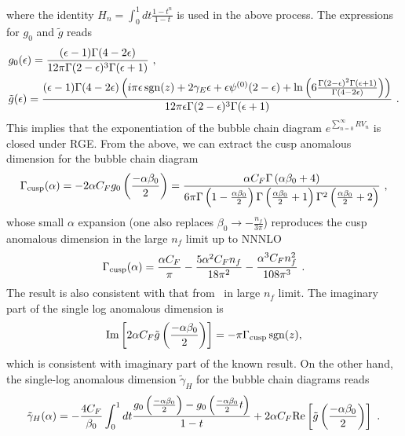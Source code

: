 \documentclass[a4paper,11pt]{article}
\begin{document}
where the identity $H_{n} = \int_0^1 dt \frac{1-t^n}{1-t}$ is used in the above process. The expressions for $g_0$ and $\tilde g$ reads
\begin{align}
&g_0(\epsilon) = \frac{(\epsilon -1) \Gamma (4-2 \epsilon )}{12 \pi  \Gamma (2-\epsilon )^3 \Gamma (\epsilon +1)} \ ,\nonumber\\
&\tilde g(\epsilon) = \frac{(\epsilon -1) \Gamma (4-2 \epsilon ) \left(i \pi  \epsilon \, {\rm sgn}(z) +2\gamma_E  \epsilon +\epsilon  \psi ^{(0)}(2-\epsilon )+\ln \left(6\frac{\Gamma (2-\epsilon )^2 \Gamma (\epsilon +1)}{\Gamma(4-2 \epsilon )}\right)\right)}{12 \pi  \epsilon  \Gamma (2-\epsilon )^3 \Gamma (\epsilon +1)} \ .
\end{align}
This implies that the exponentiation of the bubble chain diagram $e^{\sum_{n=0}^{\infty} RV_n}$ is closed under RGE. From the above, we can extract the cusp anomalous dimension for the bubble chain diagram~\cite{Beneke:1995pq}
\begin{align}\label{eq:cusp}
\Gamma_{\rm cusp}(\alpha) = -2 \alpha C_F g_0\left( \frac{-\alpha \beta_0}{2} \right) = \frac{\alpha  C_F \Gamma \left(\alpha  \beta _0+4\right)}{6 \pi  \Gamma \left(1-\frac{\alpha  \beta _0}{2}\right) \Gamma\left(\frac{\alpha  \beta _0}{2}+1\right) \Gamma^2 \left(\frac{\alpha  \beta _0}{2}+2\right)} \ ,
\end{align}
whose small $\alpha$ expansion (one also replaces $\beta_0 \rightarrow -\frac{n_f}{3\pi}$) reproduces the cusp anomalous dimension in the large $n_f$ limit up to NNNLO
\begin{align}
\Gamma_{\rm cusp}(\alpha) = \frac{\alpha  C_F}{\pi } -\frac{5 \alpha ^2 C_F n_f}{18 \pi ^2} - \frac{\alpha ^3 C_F n_f^2}{108 \pi ^3}  \ .
\end{align}
The result is also consistent with that from~\cite{Beneke:1995pq,Becher:2006mr} in large $n_f$ limit.
The imaginary part of the single log anomalous dimension is 
\begin{align}
{\rm Im}\left[ 2\alpha C_F\tilde{g}\left( \frac{-\alpha \beta_0}{2} \right) \right] = - \pi \Gamma_{\rm cusp} \, {\rm sgn}(z),
\end{align}
which is consistent with imaginary part of the known result. %
On the other hand, the single-log anomalous dimension $\tilde \gamma_H$ for the bubble chain diagrams reads
\begin{align}
    \tilde \gamma_{H}(\alpha) =-\frac{4C_F}{\beta_0} \int_0^1 dt \frac{g_0\left(\frac{-\alpha \beta_0}{2} \right)-g_0\left(\frac{-\alpha \beta_0}{2} t \right)}{1-t} + 2\alpha C_F{\rm Re}\left[\tilde{g}\left( \frac{-\alpha \beta_0}{2} \right)\right] \ .
\end{align}
\end{document}

